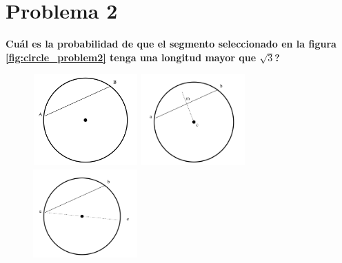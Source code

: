 \section*{Problema 2}
\textbf{Cuál es la probabilidad de que el segmento seleccionado en la figura \ref{fig:circle_problem2} tenga una longitud mayor que $\sqrt{3}$?}
\begin{figure}[H]
    \centering
    \begin{minipage}{5cm}
        \centering
        \includegraphics[width=4cm,height=3.5cm]{Graphics/circle_problem2.png}
        \caption{}
        \label{fig:circle_problem2}
    \end{minipage}
    \begin{minipage}{5cm}
        \centering
        \includegraphics[width=4cm,height=3.5cm]{Graphics/circle_2a.png}
        \caption{}
        \label{fig:circle_m}
    \end{minipage}
    \begin{minipage}{5cm}
        \centering
        \includegraphics[width=4cm,height=3.5cm]{Graphics/circle_2b.png}
        \caption{}
        \label{fig:circle_angle}
    \end{minipage}
\end{figure}
